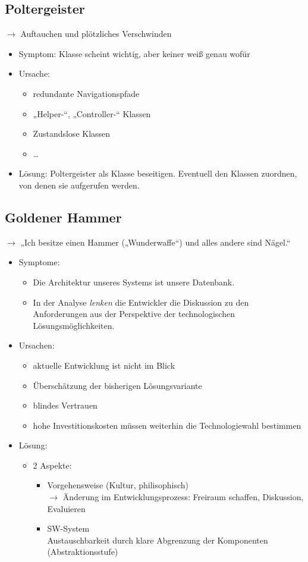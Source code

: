 \subsection{Poltergeister}
$\to$ Auftauchen und plötzliches Verschwinden
\begin{itemize}
\item Symptom: Klasse scheint wichtig, aber keiner weiß genau wofür
\item Ursache: 
\begin{itemize}
\item redundante Navigationspfade
\item „Helper-“, „Controller-“ Klassen
\item Zustandslose Klassen
\item …
\end{itemize}
\item Lösung: Poltergeister als Klasse beseitigen. Eventuell den Klassen zuordnen, von denen sie aufgerufen werden.
\end{itemize}


\subsection{Goldener Hammer}
$\to$ „Ich besitze einen Hammer („Wunderwaffe“) und alles andere sind Nägel.“

\begin{itemize}
\item Symptome:
\begin{itemize}
\item Die Architektur unseres Systems ist unsere Datenbank.
\item In der Analyse \emph{lenken} die Entwickler die Diskussion zu den Anforderungen aus der Perspektive der technologischen Lösungsmöglichkeiten.
\end{itemize}
\item Ursachen:
\begin{itemize}
\item aktuelle Entwicklung ist nicht im Blick
\item Überschätzung der bisherigen Lösungsvariante
\item blindes Vertrauen
\item hohe Investitionskosten müssen weiterhin die Technologiewahl bestimmen
\end{itemize}
\item Lösung:
\begin{itemize}
\item 2 Aspekte:
\begin{itemize}
\item Vorgehensweise (Kultur, philisophisch)\\
$\to$ Änderung im Entwicklungsprozess: Freiraum schaffen, Diskussion, Evaluieren
\item SW-System\\
Austauschbarkeit durch klare Abgrenzung der Komponenten (Abstraktionsstufe)
\end{itemize}
\end{itemize}
\end{itemize}


